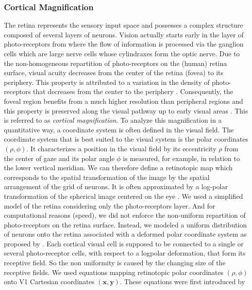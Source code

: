 \subsubsection{Cortical Magnification}
The retina represents the sensory input space and possesses a complex structure
composed of several layers of neurons. Vision actually starts early in the
layer of photo-receptors from where the flow of information is processed via
the ganglion cells which are large nerve cells whose cylindraxes form the optic
nerve. Due to the non-homogeneous repartition of photo-receptors on the (human)
retina surface, visual acuity decreases from the center of the retina (fovea)
to its periphery. This property is attributed to a variation in the density of
photo-receptors that decreases from the center to the periphery
\cite{Marilly:1999}. Consequently, the foveal region benefits from a much
higher resolution than peripheral regions and this property is preserved along
the visual pathway up to early visual areas \cite{Purves:2004}. This is
referred to as {\em cortical magnification}. To analyze this magnification in a
quantitative way, a coordinate system is often defined in the visual field. The
coordinate system that is best suited to the visual system is the polar
coordinates $(\rho,\phi)$. It characterizes a position in the visual field by
its eccentricity $\rho$ from the center of gaze and its polar angle $\phi$ is
measured, for example, in relation to the lower vertical meridian. We can
therefore define a retinotopic map which corresponds to the spatial
transformation of the image by the spatial arrangement of the grid of
neurons. It is often approximated by a log-polar transformation of the
spherical image centered on the eye \cite{Robinson:1972}. We used a simplified
model of the retina considering only the photo-receptors layer. And for
computational reasons (speed), we did not enforce the non-uniform repartition
of photo-receptors on the retina surface. Instead, we modeled a uniform
distribution of neurons onto the retina associated with a deformed polar
coordinate system as proposed by \cite{Ottes:1986}. Each cortical visual cell
is supposed to be connected to a single or several photo-receptor cells, with
respect to a logpolar deformation, that form its receptive field. So the non
uniformity is caused by the changing size of the receptive fields. We used
equations mapping retinotopic polar coordinates $(\rho,\phi)$ onto V1 Cartesian
coordinates $(\mathbf{x},\mathbf{y})$. These equations were first introduced by
